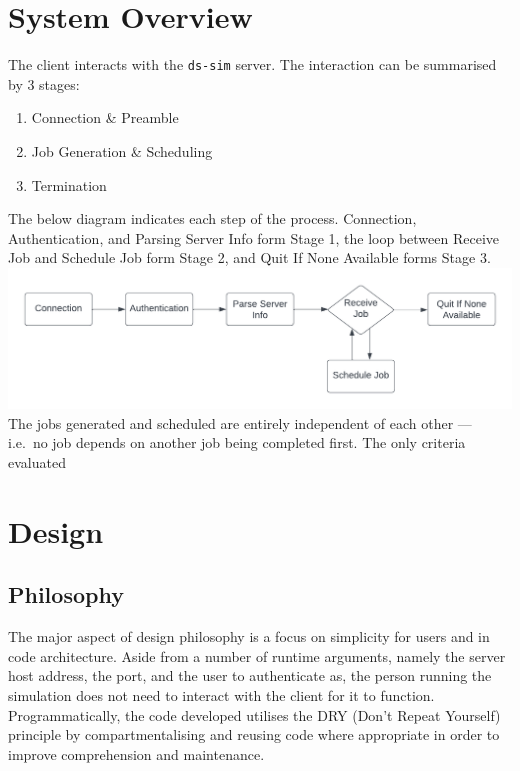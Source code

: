 \documentclass[a4paper]{article} %
\begin{document}
\section{System Overview} %
The client interacts with the \texttt{ds-sim} server. The interaction can be summarised by 3 stages: \\
\begin{enumerate}
    \item Connection \& Preamble
    \item Job Generation \& Scheduling
    \item Termination
\end{enumerate}
The below diagram indicates each step of the process. Connection, Authentication, and Parsing Server Info form Stage 1, the loop between Receive Job and Schedule Job form Stage 2, and Quit If None Available forms Stage 3.
\includegraphics[width=\textwidth]{Workflow.png} %
The jobs generated and scheduled are entirely independent of each other --- i.e.\ no job depends on another job being completed first. The only criteria evaluated  %

\pagebreak
\section{Design} %
\subsection{Philosophy}
The major aspect of design philosophy is a focus on simplicity for users and in code architecture. Aside from a number of runtime arguments, namely the server host address, the port, and the user to authenticate as, the 
person running the simulation does not need to interact with the client for it to function. Programmatically, the code developed utilises the DRY (Don't Repeat Yourself) principle by compartmentalising and reusing code 
where appropriate in order to improve comprehension and maintenance.
\end{document}
